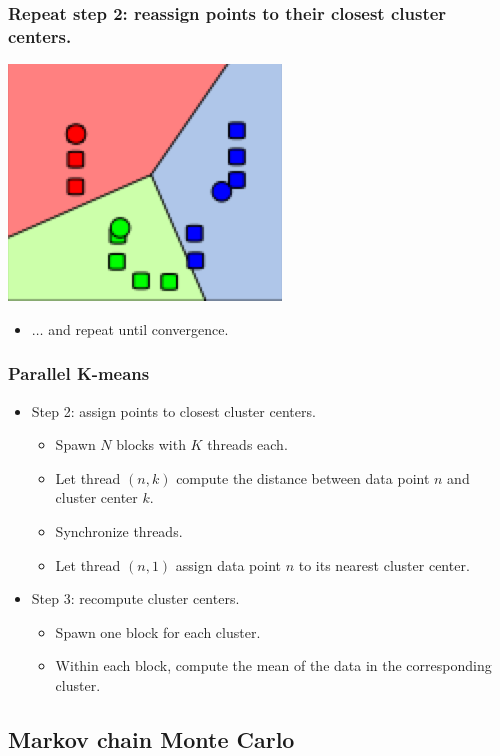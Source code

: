 \documentclass[handout]{beamer}
\numberwithin{equation}{section}
\begin{document}
\begin{frame}
\frametitle{Repeat step 2: reassign points to their closest cluster centers.}
\begin{center}
\includegraphics[scale=.6]{../../fig/kmeans4.png}
\end{center}
\begin{itemize}
\item $\ldots$ and repeat until convergence.
\end{itemize}
\end{frame}

\begin{frame}
\frametitle{Parallel K-means}
\begin{itemize}
\item Step 2: assign points to closest cluster centers.
\begin{itemize}
\pause \item Spawn $N$ blocks with $K$ threads each.
\pause \item Let thread $(n, k)$ compute the distance between data point $n$ and cluster center $k$.
\pause \item Synchronize threads.
\pause \item Let thread $(n, 1)$ assign data point $n$ to its nearest cluster center.
\end{itemize}
\pause \item Step 3: recompute cluster centers.
\begin{itemize}
\pause \item Spawn one block for each cluster.
\pause \item Within each block, compute the mean of the data in the corresponding cluster.
\end{itemize}
\end{itemize}
\end{frame}



\subsection{Markov chain Monte Carlo}
\end{document}
